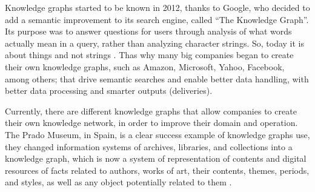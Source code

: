 Knowledge graphs started to be known in 2012, thanks to 
Google, who decided to add a semantic improvement to its search 
engine, called “The Knowledge Graph”. Its purpose was to answer 
questions for users through analysis of what words actually mean in a query, 
rather than analyzing character strings. So, today it is about things and not 
strings \cite{Barnard}. Thas why many big companies began to create their own 
knowledge graphs, such as Amazon, Microsoft, Yahoo, Facebook, among others; 
that drive semantic searches and enable better data handling, with better 
data processing and smarter outputs (deliveries).

Currently, there are different knowledge graphs that allow companies to 
create their own knowledge network, in order to improve their domain and 
operation. The Prado Museum, in Spain, is a clear success example of knowledge 
graphs use, they changed information systems of archives, libraries, 
and collections into a knowledge graph, which is now  
a system of representation of contents and digital resources of facts related 
to authors, works of art, their contents, themes, periods, and styles, as 
well as any object potentially related to them \cite{Museo del Prado}.

